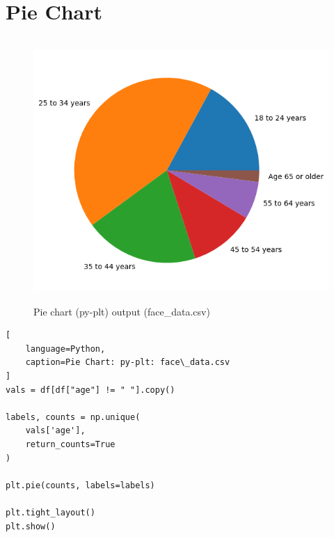 \section{Pie Chart \cite{data/online/matplotlib.pyplot.pie}} \label{Visualizing Data/Pie Chart}


\begin{table}[H]
\begin{minipage}[t]{0.35\linewidth}
\begin{figure}[H]
    \centering
    \includegraphics[width=0.9\linewidth, height=10cm, keepaspectratio]{images/data/__visualizations__/plt-pie-age-face-data.png}
    \caption{Pie chart (py-plt) output (face\_data.csv)}
\end{figure}
\end{minipage}
\hspace{0.2cm}
\vrule width 1pt
\hspace{0.5cm}
\begin{minipage}[t]{0.57\linewidth}
\begin{lstlisting}[
    language=Python,
    caption=Pie Chart: py-plt: face\_data.csv
]
vals = df[df["age"] != " "].copy()

labels, counts = np.unique(
    vals['age'], 
    return_counts=True
)

plt.pie(counts, labels=labels)

plt.tight_layout()
plt.show()
\end{lstlisting}
\end{minipage}
\end{table}


